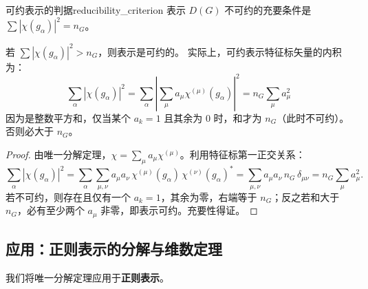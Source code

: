 \begin{theorem}{可约表示的判据}{reducibility_criterion}
    表示 $D(G)$ 不可约的充要条件是 $\sum |\chi(g_\alpha)|^2 = n_G$。
    
    若 $\sum |\chi(g_\alpha)|^2 > n_G$，则表示是可约的。
    实际上，可约表示特征标矢量的内积为：
    \begin{equation}
        \sum_{\alpha} |\chi(g_\alpha)|^2 = \sum_{\alpha} \left| \sum_\mu a_\mu \chi^{(\mu)}(g_\alpha) \right|^2 = n_G \sum_\mu a_\mu^2
    \end{equation}
    因为是整数平方和，仅当某个 $a_k=1$ 且其余为 0 时，和才为 $n_G$（此时不可约）。否则必大于 $n_G$。
\end{theorem}
\begin{proof}
    由唯一分解定理，$\chi = \sum_\mu a_\mu \chi^{(\mu)}$。利用特征标第一正交关系：
    \begin{equation}
        \sum_{\alpha} |\chi(g_\alpha)|^2 = \sum_{\alpha}\sum_{\mu,\nu} a_\mu a_\nu \,\chi^{(\mu)}(g_\alpha)\, \chi^{(\nu)}(g_\alpha)^* = \sum_{\mu,\nu} a_\mu a_\nu\, n_G\,\delta_{\mu\nu} = n_G\sum_\mu a_\mu^2.
    \end{equation}
    若不可约，则存在且仅有一个 $a_k=1$，其余为零，右端等于 $n_G$；反之若和大于 $n_G$，必有至少两个 $a_\mu$ 非零，即表示可约。充要性得证。
\end{proof}

\subsection{应用：正则表示的分解与维数定理}
我们将唯一分解定理应用于\textbf{正则表示}。

